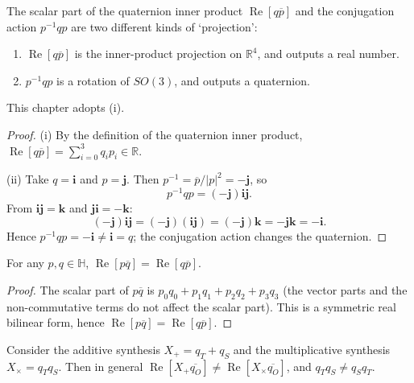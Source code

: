 \begin{proposition}\label{prop:dyn_quaternion_projection_types}
The scalar part of the quaternion inner product $\operatorname{Re}[q\overline{p}]$ and the conjugation action $p^{-1}qp$ are two different kinds of `projection':
\begin{enumerate}[label=(\roman*)]
    \item $\operatorname{Re}[q\overline{p}]$ is the inner-product projection on $\mathbb R^4$, and outputs a real number.
    \item $p^{-1}qp$ is a rotation of $SO(3)$, and outputs a quaternion.
\end{enumerate}
This chapter adopts (i).
\end{proposition}

\begin{proof}
(i) By the definition of the quaternion inner product, $\operatorname{Re}[q\overline p]=\sum_{i=0}^3 q_i p_i\in\mathbb R$.

(ii) Take $q=\mathbf i$ and $p=\mathbf j$. Then $p^{-1}=\overline p/|p|^2=-\mathbf j$, so
\[
p^{-1}qp=(-\mathbf j)\mathbf i\mathbf j.
\]
From $\mathbf i\mathbf j=\mathbf k$ and $\mathbf j\mathbf i=-\mathbf k$:
\[
(-\mathbf j)\mathbf i\mathbf j=(-\mathbf j)(\mathbf i\mathbf j)=(-\mathbf j)\mathbf k=-\mathbf j\mathbf k=-\mathbf i.
\]
Hence $p^{-1}qp=-\mathbf i\neq\mathbf i=q$; the conjugation action changes the quaternion.
\end{proof}

\begin{lemma}\label{lem:dyn_quaternion_inner_symmetry}
For any $p,q\in\mathbb H$, $\operatorname{Re}[p\overline q]=\operatorname{Re}[q\overline p]$.
\end{lemma}

\begin{proof}
The scalar part of $p\overline q$ is $p_0q_0+p_1q_1+p_2q_2+p_3q_3$ (the vector parts and the non-commutative terms do not affect the scalar part). This is a symmetric real bilinear form, hence $\operatorname{Re}[p\overline q]=\operatorname{Re}[q\overline p]$.
\end{proof}

\begin{theorem}\label{thm:dyn_quaternion_noncommutative}
Consider the additive synthesis $X_+=q_T+q_S$ and the multiplicative synthesis $X_\times=q_Tq_S$. Then in general $\operatorname{Re}[X_+\overline{q_O}]\neq\operatorname{Re}[X_\times\overline{q_O}]$, and $q_Tq_S\neq q_Sq_T$.
\end{theorem}

